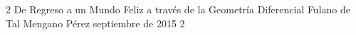 \documentclass[letterpaper, 12pt]{thesisECS}
\begin{document}
\datosThesis
%
{2}%
{De Regreso a un Mundo Feliz a través de la Geometría Diferencial}%
{Fulano de Tal}%
{Mengano Pérez}%
{septiembre de 2015}		%
{2}							%






 














\end{document}
